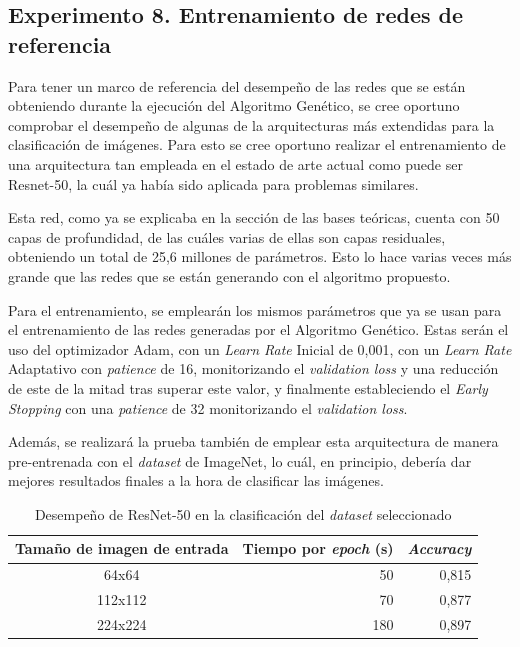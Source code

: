 \subsection{Experimento 8. Entrenamiento de redes de referencia}

Para tener un marco de referencia del desempeño de las redes que se están obteniendo durante la ejecución del Algoritmo Genético, se cree oportuno comprobar el desempeño de algunas de la arquitecturas más extendidas para la clasificación de imágenes. Para esto se cree oportuno realizar el entrenamiento de una arquitectura tan empleada en el estado de arte actual como puede ser Resnet-50, la cuál ya había sido aplicada para problemas similares.

Esta red, como ya se explicaba en la sección de las bases teóricas, cuenta con 50 capas de profundidad, de las cuáles varias de ellas son capas residuales, obteniendo un total de 25,6 millones de parámetros. Esto lo hace varias veces más grande que las redes que se están generando con el algoritmo propuesto.

Para el entrenamiento, se emplearán los mismos parámetros que ya se usan para el entrenamiento de las redes generadas por el Algoritmo Genético. Estas serán el uso del optimizador Adam, con un \textit{Learn Rate} Inicial de 0,001, con un \textit{Learn Rate} Adaptativo con \textit{patience} de 16, monitorizando el \textit{validation loss} y una reducción de este de la mitad tras superar este valor, y finalmente estableciendo el \textit{Early Stopping} con una \textit{patience} de 32 monitorizando el \textit{validation loss}.

Además, se realizará la prueba también de emplear esta arquitectura de manera pre-entrenada con el \textit{dataset} de ImageNet, lo cuál, en principio, debería dar mejores resultados finales a la hora de clasificar las imágenes.

\begin{table}[h]
\caption{Desempeño de ResNet-50 en la clasificación del \textit{dataset} seleccionado}
\label{tab:resnet_exp8}
\centering
\begin{tabular}{c|r|r}
\toprule
\multicolumn{1}{c|}{\textbf{Tamaño de imagen de entrada}} & \multicolumn{1}{c|}{\textbf{Tiempo por \textit{epoch} (s)}} & \multicolumn{1}{c}{\textit{\textbf{Accuracy}}} \\ \hline
64x64                                                     & 50                                                 & 0,815                                  \\
112x112                                                   & 70                                                 & 0,877                                 \\
224x224                                                   & 180   & 0,897 \\
\bottomrule
\end{tabular}
\end{table}



